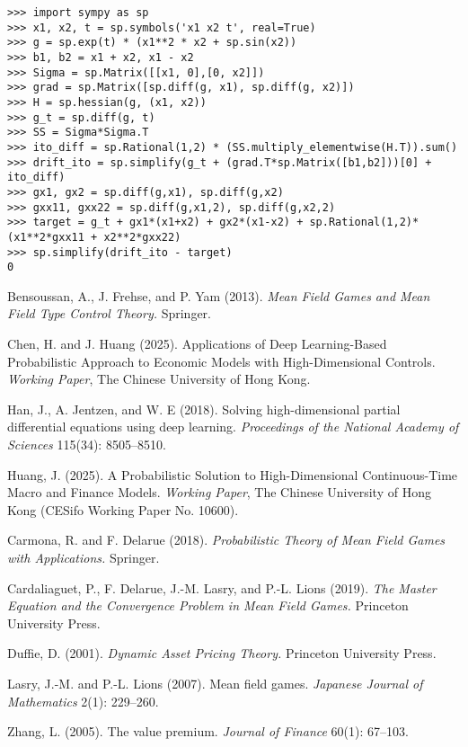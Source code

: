 \documentclass[11pt,letterpaper,oneside]{article}
\begin{document}
\begin{verbatim}
>>> import sympy as sp
>>> x1, x2, t = sp.symbols('x1 x2 t', real=True)
>>> g = sp.exp(t) * (x1**2 * x2 + sp.sin(x2))
>>> b1, b2 = x1 + x2, x1 - x2
>>> Sigma = sp.Matrix([[x1, 0],[0, x2]])
>>> grad = sp.Matrix([sp.diff(g, x1), sp.diff(g, x2)])
>>> H = sp.hessian(g, (x1, x2))
>>> g_t = sp.diff(g, t)
>>> SS = Sigma*Sigma.T
>>> ito_diff = sp.Rational(1,2) * (SS.multiply_elementwise(H.T)).sum()
>>> drift_ito = sp.simplify(g_t + (grad.T*sp.Matrix([b1,b2]))[0] + ito_diff)
>>> gx1, gx2 = sp.diff(g,x1), sp.diff(g,x2)
>>> gxx11, gxx22 = sp.diff(g,x1,2), sp.diff(g,x2,2)
>>> target = g_t + gx1*(x1+x2) + gx2*(x1-x2) + sp.Rational(1,2)*(x1**2*gxx11 + x2**2*gxx22)
>>> sp.simplify(drift_ito - target)
0
\end{verbatim}

\begin{thebibliography}{99}\small

 Bensoussan, A., J. Frehse, and P. Yam (2013).
\emph{Mean Field Games and Mean Field Type Control Theory.}
Springer.

 Chen, H. and J. Huang (2025).
Applications of Deep Learning-Based Probabilistic Approach to Economic Models with High-Dimensional Controls.
\emph{Working Paper}, The Chinese University of Hong Kong.

 Han, J., A. Jentzen, and W. E (2018).
Solving high-dimensional partial differential equations using deep learning.
\emph{Proceedings of the National Academy of Sciences} 115(34): 8505--8510.

 Huang, J. (2025).
A Probabilistic Solution to High-Dimensional Continuous-Time Macro and Finance Models.
\emph{Working Paper}, The Chinese University of Hong Kong (CESifo Working Paper No. 10600).

 Carmona, R. and F. Delarue (2018).
\emph{Probabilistic Theory of Mean Field Games with Applications.}
Springer.

 Cardaliaguet, P., F. Delarue, J.-M. Lasry, and P.-L. Lions (2019).
\emph{The Master Equation and the Convergence Problem in Mean Field Games.}
Princeton University Press.

 Duffie, D. (2001).
\emph{Dynamic Asset Pricing Theory.}
Princeton University Press.

 Lasry, J.-M. and P.-L. Lions (2007).
Mean field games.
\emph{Japanese Journal of Mathematics} 2(1): 229--260.

 Zhang, L. (2005).
The value premium.
\emph{Journal of Finance} 60(1): 67--103.

\end{thebibliography}
\end{document}
